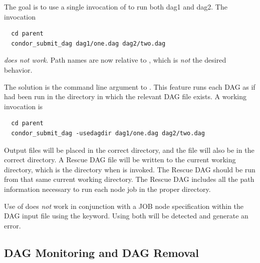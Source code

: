 The goal is to use a single invocation of 
to run both dag1 and dag2.
The invocation
\begin{verbatim}
  cd parent
  condor_submit_dag dag1/one.dag dag2/two.dag
\end{verbatim}
\emph{does not work}.
Path names are now relative to , 
which is \emph{not} the desired behavior.

The solution is 
the  command line argument to .
This feature runs each DAG as if  had been run 
in the directory in which the relevant DAG file exists.
A working invocation is
\begin{verbatim}
  cd parent
  condor_submit_dag -usedagdir dag1/one.dag dag2/two.dag
\end{verbatim}

Output files will be placed in the correct directory, and
the  file will also be in the correct directory.
A Rescue DAG file will be written to
the current working directory, which is the directory when
 is invoked.
The Rescue DAG should be run from that same current working directory.
The Rescue DAG includes all the path information necessary to
run each node job in the proper directory.



Use of  does \emph{not} work in conjunction with
a JOB node specification within the DAG input file using
the  keyword.
Using both will be detected and generate an error. 

\subsection{\label{sec:DAGMonitoring}DAG Monitoring and DAG Removal}

